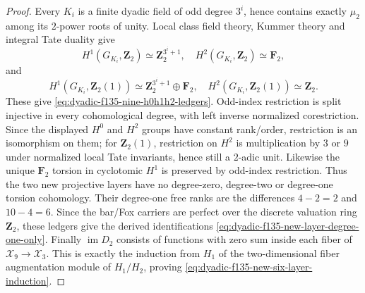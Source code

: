 \begin{proof}
Every $K_i$
is a finite
dyadic field
of odd degree
$3^i$,
hence contains
exactly $\mu_2$
among its
$2$-power
roots of unity.
Local class
field theory,
Kummer theory
and integral
Tate duality
give
\[
H^1(G_{K_i},\mathbf Z_2)
\simeq\mathbf Z_2^{3^i+1},
\quad
H^2(G_{K_i},\mathbf Z_2)
\simeq\mathbf F_2,
\]
and
\[
H^1(G_{K_i},\mathbf Z_2(1))
\simeq\mathbf Z_2^{3^i+1}
\oplus\mathbf F_2,
\quad
H^2(G_{K_i},\mathbf Z_2(1))
\simeq\mathbf Z_2 .
\]
These give
\eqref{eq:dyadic-f135-nine-h0h1h2-ledgers}.
Odd-index
restriction is
split injective
in every
cohomological
degree, with
left inverse
normalized
corestriction.
Since the
displayed
$H^0$ and
$H^2$ groups
have constant
rank/order,
restriction
is an
isomorphism
on them;
for $\mathbf Z_2(1)$,
restriction
on $H^2$
is multiplication
by $3$ or $9$
under normalized
local Tate
invariants,
hence still
a $2$-adic
unit.
Likewise
the unique
$\mathbf F_2$
torsion in
cyclotomic
$H^1$
is preserved
by odd-index
restriction.
Thus the two
new projective
layers have
no degree-zero,
degree-two
or degree-one
torsion
cohomology.
Their degree-one
free ranks
are the
differences
$4-2=2$ and
$10-4=6$.
Since the
bar/Fox
carriers are
perfect over
the discrete
valuation ring
$\mathbf Z_2$,
these ledgers
give the
derived
identifications
\eqref{eq:dyadic-f135-new-layer-degree-one-only}.
Finally
$\operatorname{im}D_2$
consists of
functions with
zero sum
inside each
fiber of
$\mathscr X_9\to\mathscr X_3$.
This is exactly
the induction
from $H_1$
of the
two-dimensional
fiber augmentation
module of
$H_1/H_2$,
proving
\eqref{eq:dyadic-f135-new-six-layer-induction}.
\end{proof}

